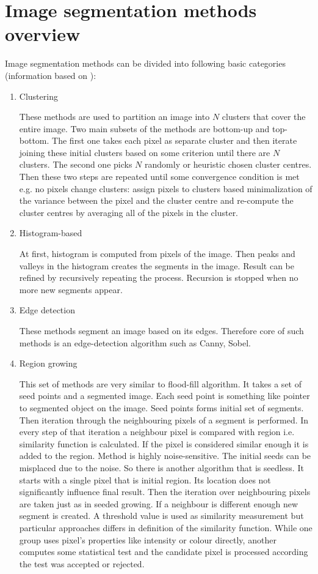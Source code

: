 \section{Image segmentation methods overview}

Image segmentation methods can be divided into following basic categories (information based on \cite{wiki}):

\begin{enumerate}

  \item Clustering

  These methods are used to partition an image into $N$ clusters that cover the entire image.
Two main subsets of the methods are bottom-up and top-bottom.
The first one takes each pixel as separate cluster and then iterate joining these initial clusters based on some criterion until there are $N$ clusters.
The second one picks $N$ randomly or heuristic chosen cluster centres.
Then these two steps are repeated until some convergence condition is met e.g. no pixels change clusters: assign pixels to clusters based minimalization of the variance between the pixel and the cluster centre and re-compute the cluster centres by averaging all of the pixels in the cluster.

  \item Histogram-based

  At first, histogram is computed from pixels of the image.
Then peaks and valleys in the histogram creates the segments in the image.
Result can be refined by recursively repeating the process.
Recursion is stopped when no more new segments appear.

  \item Edge detection

  These methods segment an image based on its edges.
Therefore core of such methods is an edge-detection algorithm such as Canny, Sobel.

  \item Region growing

  This set of methods are very similar to flood-fill algorithm.
It takes a set of seed points and a segmented image.
Each seed point is something like pointer to segmented object on the image.
Seed points forms initial set of segments.
Then iteration through the neighbouring pixels of a segment is performed.
In every step of that iteration a neighbour pixel is compared with region i.e. similarity function is calculated.
If the pixel is considered similar enough it is added to the region.
Method is highly noise-sensitive.
The initial seeds can be misplaced due to the noise.
So there is another algorithm that is seedless.
It starts with a single pixel that is initial region.
Its location does not significantly influence final result.
Then the iteration over neighbouring pixels are taken just as in seeded growing.
If a neighbour is different enough new segment is created.
A threshold value is used as similarity measurement but particular approaches differs in definition of the similarity function.
While one group uses pixel's properties like intensity or colour directly, another computes some statistical test and the candidate pixel is processed according the test was accepted or rejected.


\end{enumerate}
